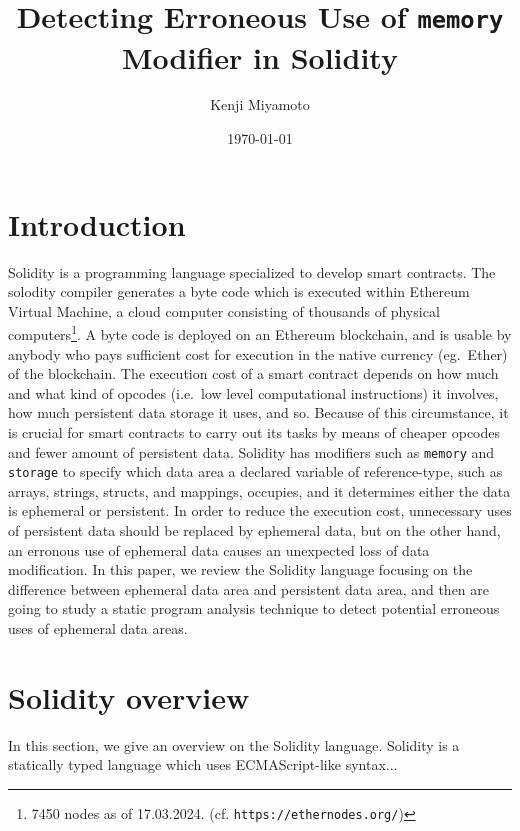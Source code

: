 \documentclass{article}
\title{Detecting Erroneous Use of \texttt{memory} Modifier in Solidity}
\author{Kenji Miyamoto}
\date{\today}
\begin{document}
\maketitle
\section{Introduction}
Solidity is a programming language specialized to develop smart
contracts.  The solodity compiler generates a byte code which is executed
within Ethereum Virtual Machine, a cloud computer consisting of
thousands of physical computers\footnote{7450 nodes as of
17.03.2024. (cf. \texttt{https://ethernodes.org/})}.  A byte code is
deployed on an Ethereum blockchain, and is usable by anybody who pays
sufficient cost for execution in the native currency (eg.~Ether) of
the blockchain.  The execution cost of a smart contract depends on how
much and what kind of opcodes (i.e.~low level computational
instructions) it involves, how much persistent data storage it uses,
and so.  Because of this circumstance, it is crucial for smart
contracts to carry out its tasks by means of cheaper opcodes and fewer
amount of persistent data.  Solidity has modifiers such as
\texttt{memory} and \texttt{storage} to specify which data area a
declared variable of reference-type, such as arrays, strings, structs,
and mappings, occupies, and it determines either the data is ephemeral
or persistent.  In order to reduce the execution cost, unnecessary
uses of persistent data should be replaced by ephemeral data, but on
the other hand, an erronous use of ephemeral data causes an unexpected
loss of data modification.  In this paper, we review the Solidity
language focusing on the difference between ephemeral data area and
persistent data area, and then are going to study a static program
analysis technique to detect potential erroneous uses of ephemeral
data areas.
\section{Solidity overview}
In this section, we give an overview on the Solidity language.
Solidity is a statically typed language which uses ECMAScript-like syntax...
\end{document}
